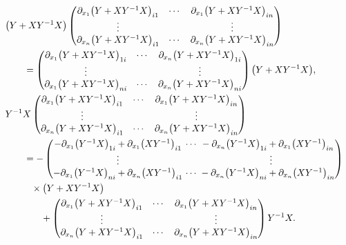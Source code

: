 \documentclass[10pt,a4paper]{amsart}
\numberwithin{equation}{section}
\begin{document}
\begin{align}
\\
& \bigl(Y+XY^{-1}X\bigr)
\begin{pmatrix}
\partial_{x_1}\bigl(Y+XY^{-1}X\bigr)_{i1} & \cdots & \partial_{x_1}\bigl(Y+XY^{-1}X\bigr)_{in} \\
\vdots & & \vdots \\
\partial_{x_n}\bigl(Y+XY^{-1}X\bigr)_{i1} & \cdots & \partial_{x_n}\bigl(Y+XY^{-1}X\bigr)_{in}
\end{pmatrix}\nonumber \\
&\qquad=
\begin{pmatrix}
\partial_{x_1}\bigl(Y+XY^{-1}X\bigr)_{1i} & \cdots & \partial_{x_n}\bigl(Y+XY^{-1}X\bigr)_{1i} \\
\vdots & & \vdots \\
\partial_{x_1}\bigl(Y+XY^{-1}X\bigr)_{ni} & \cdots & \partial_{x_n}\bigl(Y+XY^{-1}X\bigr)_{ni}
\end{pmatrix}
\bigl(Y+XY^{-1}X\bigr),\label{K7}
\\
&Y^{-1}X
\begin{pmatrix}
\partial_{x_1}\bigl(Y+XY^{-1}X\bigr)_{i1} & \cdots & \partial_{x_1}\bigl(Y+XY^{-1}X\bigr)_{in} \\
\vdots & & \vdots \\
\partial_{x_n}\bigl(Y+XY^{-1}X\bigr)_{i1} & \cdots & \partial_{x_n}\bigl(Y+XY^{-1}X\bigr)_{in}
\end{pmatrix}\nonumber\\
&\qquad= -
\begin{pmatrix}
 - \partial_{x_1}\bigl(Y^{-1}X\bigr)_{1i} + \partial_{x_1}\bigl(XY^{-1}\bigr)_{i1} & {\hspace*{-3mm}}\cdots & {\hspace*{-3mm}}- \partial_{x_n}\bigl(Y^{-1}X\bigr)_{1i} + \partial_{x_1}\bigl(XY^{-1}\bigr)_{in} \\
\vdots & & \vdots \\
 - \partial_{x_1}\bigl(Y^{-1}X\bigr)_{ni} + \partial_{x_n}\bigl(XY^{-1}\bigr)_{i1} & {\hspace*{-3mm}}\cdots & {\hspace*{-3mm}}- \partial_{x_n}\bigl(Y^{-1}X\bigr)_{ni} + \partial_{x_n}\bigl(XY^{-1}\bigr)_{in}
\end{pmatrix}
\nonumber \\
&\phantom{\qquad=}{}\times \bigl(Y + XY^{-1}X\bigr)\nonumber\\
&\phantom{\qquad=\times}{}+
\begin{pmatrix}
\partial_{x_1}\bigl(Y+XY^{-1}X\bigr)_{i1} & \cdots & \partial_{x_1}\bigl(Y+XY^{-1}X\bigr)_{in} \\
\vdots & & \vdots \\
\partial_{x_n}\bigl(Y+XY^{-1}X\bigr)_{i1} & \cdots & \partial_{x_n}\bigl(Y+XY^{-1}X\bigr)_{in}
\end{pmatrix}
Y^{-1}X.\label{K8}
\end{align}
\end{document}
